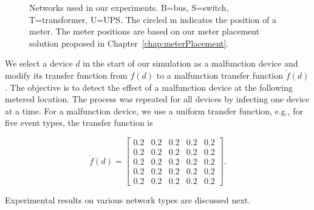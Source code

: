 \begin{figure}[!p]
\centering
{}

\begin{centering}
\end{centering}

\begin{centering}
\end{centering}

\begin{centering}
\end{centering}
\vspace{0.5cm}
\caption{Networks used in our experiments. B=bus, S=switch, T=transformer,
U=UPS. The circled m indicates the position of a meter. The meter positions are based on our meter placement solution proposed in Chapter~\ref{chap:meterPlacement}.}
\vspace{1cm} 
\label{mf_networks_used}
\end{figure}

We select a device $d$ in the start of our simulation as a malfunction device and modify its transfer function from $f(d)$ to a malfunction transfer function $\acute f(d)$. The objective is to detect the effect of a malfunction device at the following metered location. The process was repeated for all devices by infecting one device at a time. For a malfunction device, we use a uniform transfer function, e.g., for five event types, the transfer function is

\[\acute f(d) = \left[\begin{array}{ccccc}
0.2 & 0.2 & 0.2 & 0.2 & 0.2\\
0.2 & 0.2 & 0.2 & 0.2 & 0.2\\
0.2 & 0.2 & 0.2 & 0.2 & 0.2\\
0.2 & 0.2 & 0.2 & 0.2 & 0.2\\
0.2 & 0.2 & 0.2 & 0.2 & 0.2\end{array}\right].\]

\noindent Experimental results on various network types are discussed next.



